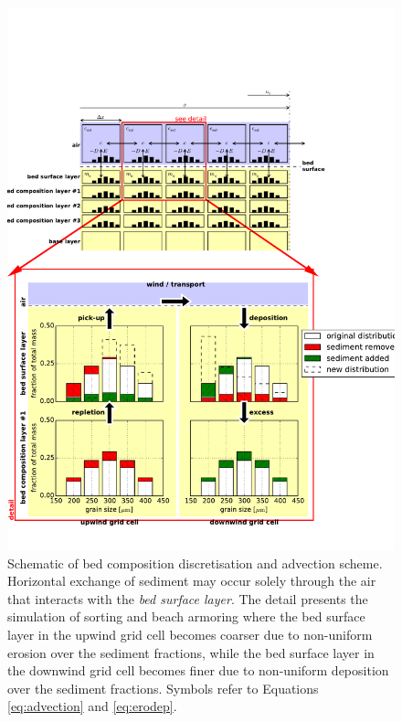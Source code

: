 \begin{figure}
  \centering
  \includegraphics[trim={0 1.3cm 0 6cm},clip,width=\columnwidth]{../Figures/bedcomposition}
  \caption{Schematic of bed composition discretisation and advection
    scheme. Horizontal exchange of sediment may occur solely through
    the air that interacts with the \textit{bed surface layer}. The
    detail presents the simulation of sorting and beach armoring where
    the bed surface layer in the upwind grid cell becomes coarser due
    to non-uniform erosion over the sediment fractions, while the bed
    surface layer in the downwind grid cell becomes finer due to
    non-uniform deposition over the sediment fractions. Symbols refer
    to Equations \ref{eq:advection} and \ref{eq:erodep}.}
  \label{fig:bedcomposition}
\end{figure}

